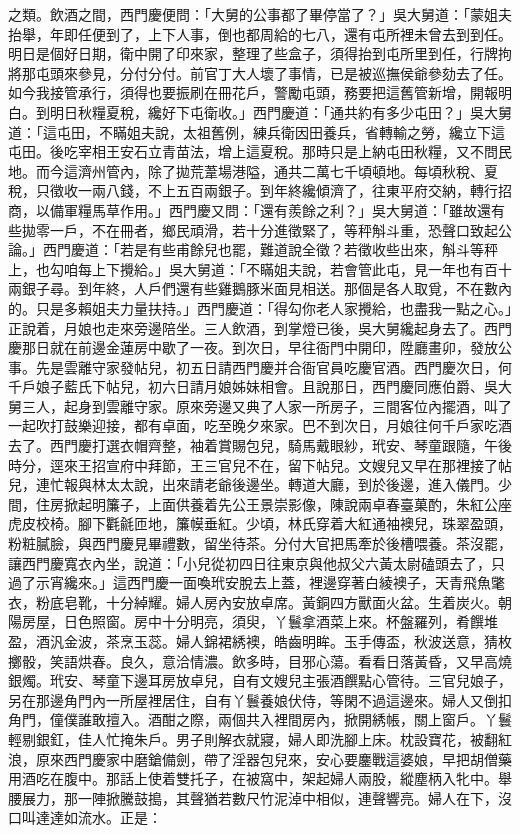 之類。飲酒之間，西門慶便問：「大舅的公事都了畢停當了？」吳大舅道：「蒙姐夫抬舉，年即任便到了，上下人事，倒也都周給的七八，還有屯所裡未曾去到到任。明日是個好日期，衛中開了印來家，整理了些盒子，須得抬到屯所里到任，行牌拘將那屯頭來參見，分付分付。前官丁大人壞了事情，已是被巡撫侯爺參劾去了任。如今我接管承行，須得也要振刷在冊花戶，警勵屯頭，務要把這舊管新增，開報明白。到明日秋糧夏稅，纔好下屯衛收。」西門慶道：「通共約有多少屯田？」吳大舅道：「這屯田，不瞞姐夫說，太祖舊例，練兵衛因田養兵，省轉輸之勞，纔立下這屯田。後吃宰相王安石立青苗法，增上這夏稅。那時只是上納屯田秋糧，又不問民地。而今這濟州管內，除了拋荒葦場港隘，通共二萬七千頃頓地。每頃秋稅、夏稅，只徵收一兩八錢，不上五百兩銀子。到年終纔傾濟了，往東平府交納，轉行招商，以備軍糧馬草作用。」西門慶又問：「還有羨餘之利？」吳大舅道：「雖故還有些拋零一戶，不在冊者，鄉民頑滑，若十分進徵緊了，等秤斛斗重，恐聲口致起公論。」西門慶道：「若是有些甫餘兒也罷，難道說全徵？若徵收些出來，斛斗等秤上，也勾咱每上下攪給。」吳大舅道：「不瞞姐夫說，若會管此屯，見一年也有百十兩銀子尋。到年終，人戶們還有些雞鵝豚米面見相送。那個是各人取覓，不在數內的。只是多賴姐夫力量扶持。」西門慶道：「得勾你老人家攪給，也盡我一點之心。」正說着，月娘也走來旁邊陪坐。三人飲酒，到掌燈已後，吳大舅纔起身去了。西門慶那日就在前邊金蓮房中歇了一夜。到次日，早往衙門中開印，陞廳畫卯，發放公事。先是雲離守家發帖兒，初五日請西門慶并合衙官員吃慶官酒。西門慶次日，何千戶娘子藍氏下帖兒，初六日請月娘姊妹相會。且說那日，西門慶同應伯爵、吳大舅三人，起身到雲離守家。原來旁邊又典了人家一所房子，三間客位內擺酒，叫了一起吹打鼓樂迎接，都有卓面，吃至晚夕來家。巴不到次日，月娘往何千戶家吃酒去了。西門慶打選衣帽齊整，袖着賞賜包兒，騎馬戴眼紗，玳安、琴童跟隨，午後時分，逕來王招宣府中拜節，王三官兒不在，留下帖兒。文嫂兒又早在那裡接了帖兒，連忙報與林太太說，出來請老爺後邊坐。轉道大廳，到於後邊，進入儀門。少間，住房掀起明簾子，上面供養着先公王景崇影像，陳說兩卓春臺菓酌，朱紅公座虎皮校椅。腳下氍毹匝地，簾幙垂紅。少頃，林氏穿着大紅通袖襖兒，珠翠盈頭，粉粧膩臉，與西門慶見畢禮數，留坐待茶。分付大官把馬牽於後槽喂養。茶沒罷，讓西門慶寬衣內坐，說道：「小兒從初四日往東京與他叔父六黃太尉磕頭去了，只過了示宵纔來。」這西門慶一面喚玳安脫去上蓋，裡邊穿著白綾襖子，天青飛魚氅衣，粉底皂靴，十分綽耀。婦人房內安放卓席。黃銅四方獸面火盆。生着炭火。朝陽房屋，日色照窗。房中十分明亮，須臾，丫鬟拿酒菜上來。杯盤羅列，肴饌堆盈，酒汎金波，茶烹玉蕊。婦人錦裙綉襖，皓齒明眸。玉手傳盃，秋波送意，猜枚擲骰，笑語烘春。良久，意洽情濃。飲多時，目邪心蕩。看看日落黃昏，又早高燒銀燭。玳安、琴童下邊耳房放卓兒，自有文嫂兒主張酒饌點心管待。三官兒娘子，另在那邊角門內一所屋裡居住，自有丫鬟養娘伏侍，等閑不過這邊來。婦人又倒扣角門，僮僕誰敢擅入。酒酣之際，兩個共入裡間房內，掀開綉帳，關上窗戶。丫鬟輕剔銀釭，佳人忙掩朱戶。男子則解衣就寢，婦人即洗腳上床。枕設寶花，被翻紅浪，原來西門慶家中磨鎗備劍，帶了淫器包兒來，安心要鏖戰這婆娘，早把胡僧藥用酒吃在腹中。那話上使着雙托子，在被窩中，架起婦人兩股，縱塵柄入牝中。舉腰展力，那一陣掀騰鼓搗，其聲猶若數尺竹泥淖中相似，連聲響亮。婦人在下，沒口叫達達如流水。正是：

